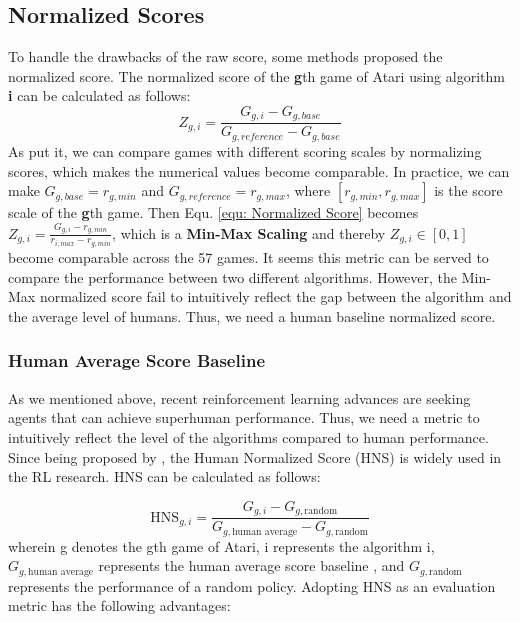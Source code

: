 \documentclass[nohyperref]{article}
\theoremstyle{plain}
\begin{document}
\subsection{Normalized Scores}
To handle the drawbacks of the raw score, some methods \citep{ale,dqn} proposed the normalized score. The normalized score of the \textbf{g}th game of Atari using algorithm \textbf{i} can be calculated as follows:
\begin{equation}
\label{equ: Normalized Score}
    Z_{g,i} = \frac{G_{g,i}-G_{g,base}}{G_{g,reference}-G_{g,base}}
\end{equation}
As \citet{ale} put it, we can compare games with different scoring scales by  normalizing scores, which makes the numerical values become comparable. In practice, we can make $G_{g,base} = r_{g,min}$ and $G_{g,reference} = r_{g,max}$, where $[r_{g,min},r_{g,max}]$ is the score scale of the \textbf{g}th game. Then Equ. \eqref{equ: Normalized Score} becomes $Z_{g,i} = \frac{G_{g,i}-r_{g,min}}{r_{i,max}-r_{g,min}}$, which is a \textbf{Min-Max Scaling} and thereby $Z_{g,i} \in [0,1]$ become comparable across the 57 games. It seems this metric can be served to compare the performance between two different algorithms. However, the Min-Max normalized score fail to intuitively reflect the gap between the algorithm and the average level of humans. Thus, we need a human baseline normalized score.

\subsubsection{Human Average Score Baseline}
As we mentioned above, recent reinforcement learning advances \citep{agent57,ngu,r2d2,goexplore,muzero,muesli,rainbow} are seeking agents that can achieve superhuman performance. Thus, we need a metric to intuitively reflect the level of the algorithms compared to human performance. Since being proposed by \citep{ale}, the Human Normalized Score (HNS) is widely used in the RL research\citep{ale2}. HNS can be calculated as follows:

\begin{equation}
     \text{HNS}_{g,i} = \frac{G_{g,i}-G_{g,\text{random}}}{G_{g,\text{human average}}-G_{g,\text{random}}}
\end{equation}
wherein g denotes the gth game of Atari, i represents the algorithm i, $G_{g,\text{human average}}$ represents the human average score baseline \citep{atarihuman}, and $G_{g,\text{random}}$ represents the performance of a random policy. Adopting HNS as an evaluation metric has the following advantages:
\end{document}
